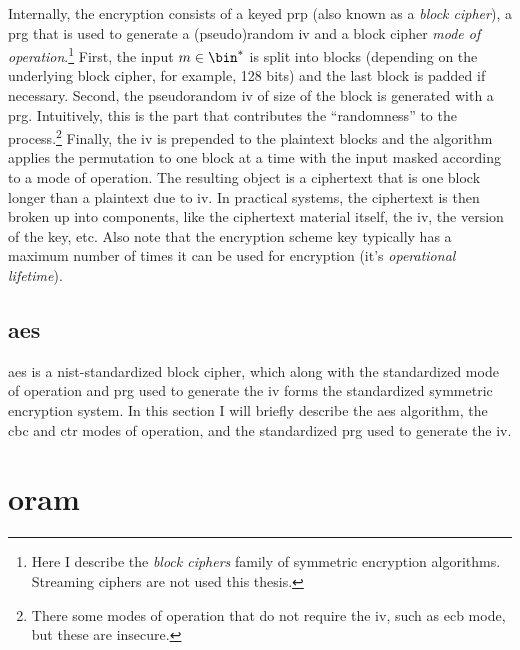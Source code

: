 		Internally, the encryption consists of a keyed \acrfull{prp} (also known as a \emph{block cipher}), a \acrfull{prg} that is used to generate a (pseudo)random \acrfull{iv} and a block cipher \emph{mode of operation}.\footnote{%
			Here I describe the \emph{block ciphers} family of symmetric encryption algorithms.
			Streaming ciphers are not used this thesis.
		}
		First, the input $m \in \bin^*$ is split into blocks (depending on the underlying block cipher, for example, 128 bits) and the last block is padded if necessary.
		Second, the pseudorandom \acrlong{iv} of size of the block is generated with a \acrshort{prg}.
		Intuitively, this is the part that contributes the  ``randomness'' to the process.\footnote{
			There some modes of operation that do not require the \acrlong{iv}, such as \acrfull{ecb} mode, but these are insecure.
		}
		Finally, the \acrshort{iv} is prepended to the plaintext blocks and the algorithm applies the permutation to one block at a time with the input masked according to a mode of operation.
		The resulting object is a ciphertext that is one block longer than a plaintext due to \acrshort{iv}.
		In practical systems, the ciphertext is then broken up into components, like the ciphertext material itself, the \acrshort{iv}, the version of the key, etc.
		Also note that the encryption scheme key typically has a maximum number of times it can be used for encryption (it's \emph{operational lifetime}).

		\subsection{\texorpdfstring{\acrlong{aes}}{Advanced Encryption Standard}}

			\acrfull{aes} is a \acrshort{nist}-standardized block cipher, which along with the standardized mode of operation and \acrshort{prg} used to generate the \acrshort{iv} forms the standardized symmetric encryption system.
			In this section I will briefly describe the \acrshort{aes} algorithm, the \acrshort{cbc} and \acrshort{ctr} modes of operation, and the standardized \acrshort{prg} used to generate the \acrshort{iv}.


	\section{\texorpdfstring{\acrlong{oram}}{Oblivious Random Access Machine}}

